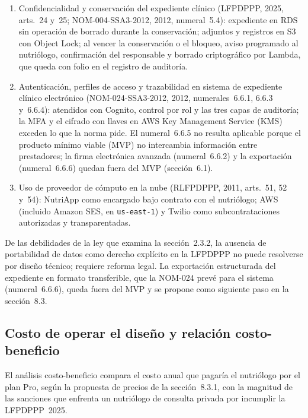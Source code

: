 \documentclass[12pt, a4paper]{article}
\begin{document}
\begin{enumerate}[label=\Roman*.]
    al nutriólogo, que decide y envía el aviso; la plataforma asienta
    fecha, alcance y acciones con folio.
  \item Confidencialidad y conservación del expediente clínico
    (LFPDPPP, 2025, arts.~24 y~25; NOM-004-SSA3-2012, 2012, numeral~5.4):
    expediente en RDS sin operación de borrado durante la conservación;
    adjuntos y registros en S3 con Object Lock; al vencer la conservación o
    el bloqueo, aviso programado al nutriólogo, confirmación del
    responsable y borrado criptográfico por Lambda, que queda con
    folio en el registro de auditoría.
  \item Autenticación, perfiles de acceso y trazabilidad en sistema
    de expediente clínico electrónico (NOM-024-SSA3-2012, 2012, numerales~6.6.1,
    6.6.3 y~6.6.4): atendidos con Cognito, control por rol y las tres
    capas de auditoría; la MFA y el cifrado con llaves en AWS Key Management Service (KMS) exceden lo
    que la norma pide. El numeral~6.6.5 no resulta aplicable porque el producto mínimo viable (MVP) no
    intercambia información entre prestadores; la firma electrónica
    avanzada (numeral~6.6.2) y la exportación (numeral~6.6.6) quedan
    fuera del MVP (sección~6.1).
  \item Uso de proveedor de cómputo en la nube (RLFPDPPP, 2011, arts.~51,
    52 y~54): NutriApp como encargado bajo contrato con el nutriólogo;
    AWS (incluido Amazon SES, en \texttt{us-east-1}) y Twilio
    como subcontrataciones autorizadas y
    transparentadas.
\end{enumerate}
\endgroup
 
De las debilidades de la ley que examina la sección~2.3.2, la ausencia
de portabilidad de datos como derecho explícito en la LFPDPPP no puede
resolverse por diseño técnico; requiere reforma legal. La exportación
estructurada del expediente en formato transferible, que la NOM-024 prevé
para el sistema (numeral~6.6.6), queda fuera del MVP y se
propone como siguiente paso en la sección~8.3.

\subsection{Costo de operar el diseño y relación costo-beneficio}
\label{sec:costos}
 
El análisis costo-beneficio compara el costo anual que pagaría el nutriólogo por el
plan Pro, según la propuesta de precios de la sección~8.3.1, con la magnitud de las sanciones que enfrenta un
nutriólogo de consulta privada por incumplir la LFPDPPP~2025.
 
\end{document}

